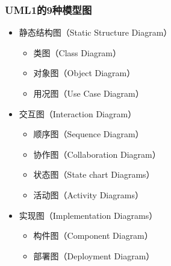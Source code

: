 \documentclass[compress]{beamer}
\begin{document}
\begin{frame}
  \frametitle{UML1的9种模型图}
  \small
  \begin{itemize}
    \item 静态结构图（Static Structure Diagram）
      \begin{itemize}
        \item [] 类图（Class Diagram）
        \item [] 对象图（Object Diagram）
        \item [] 用况图（Use Case Diagram）
      \end{itemize}
    \item 交互图（Interaction Diagram）
      \begin{itemize}
      \item [] 顺序图（Sequence Diagram）
      \item [] 协作图（Collaboration Diagram）
      \item [] 状态图（State chart Diagrams） 
      \item [] 活动图（Activity Diagrams）
      \end{itemize}
    \item 实现图（Implementation Diagrams）
      \begin{itemize}
        \item [] 构件图（Component Diagram）
        \item [] 部署图（Deployment Diagram）
      \end{itemize}
    \end{itemize}
\end{frame}
\end{document}
